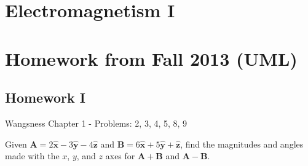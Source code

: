 \documentclass[crop=false,class=article,oneside]{standalone}
\begin{document}
    \ifx\ifphysicscourseselectromagnetismI\undefined
        \section*{Electromagnetism I}
        \setcounter{section}{1}
        \renewcommand\thefigure{\arabic{section}.\arabic{figure}}
        \renewcommand\thesubfigure{%
            \arabic{section}.\arabic{figure}.\arabic{subfigure}}
    \else
        \section{Homework from Fall 2013 (UML)}
    \fi
    \subsection{Homework I}
        Wangsness Chapter 1 - Problems: 2, 3, 4, 5, 8, 9
        \begin{problem}[Wangsness 1-2]
            Given
            $\mathbf{A}%
             =2\hat{\mathbf{x}}-3\hat{\mathbf{y}}%
             -4\hat{\mathbf{z}}$
            and
            $\mathbf{B}%
             =6\hat{\mathbf{x}}+5\hat{\mathbf{y}}%
             +\hat{\mathbf{z}}$,
            find the magnitudes and angles made with the $x$,
            $y$, and $z$ axes for
            $\mathbf{A}+\mathbf{B}$ and $\mathbf{A}-\mathbf{B}$.
        \end{problem}
\end{document}
